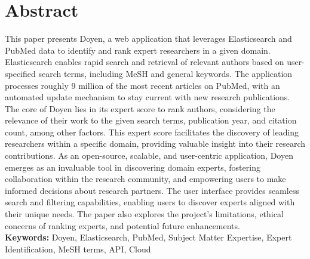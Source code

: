 \section*{Abstract}
This paper presents Doyen, a web application that leverages Elasticsearch and PubMed data to identify and rank expert researchers in a given domain. Elasticsearch enables rapid search and retrieval of relevant authors based on user-specified search terms, including MeSH and general keywords. The application processes roughly 9 million of the most recent articles on PubMed, with an automated update mechanism to stay current with new research publications. The core of Doyen lies in its expert score to rank authors, considering the relevance of their work to the given search terms, publication year, and citation count, among other factors. This expert score facilitates the discovery of leading researchers within a specific domain, providing valuable insight into their research contributions. As an open-source, scalable, and user-centric application, Doyen emerges as an invaluable tool in discovering domain experts, fostering collaboration within the research community, and empowering users to make informed decisions about research partners. The user interface provides seamless search and filtering capabilities, enabling users to discover experts aligned with their unique needs. The paper also explores the project's limitations, ethical concerns of ranking experts, and potential future enhancements. \\

{\small \textbf{Keywords:} Doyen, Elasticsearch, PubMed, Subject Matter Expertise, Expert Identification, MeSH terms, API, Cloud }